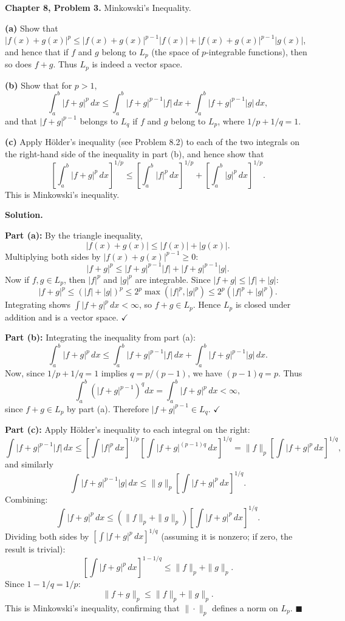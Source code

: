 \documentclass[12pt]{article}
\begin{document}
\textbf{Chapter 8, Problem 3.} Minkowski's Inequality.

\textbf{(a)} Show that $|f(x)+g(x)|^p \le |f(x)+g(x)|^{p-1}|f(x)| + |f(x)+g(x)|^{p-1}|g(x)|$, and hence that if $f$ and $g$ belong to $L_p$ (the space of $p$-integrable functions), then so does $f+g$. Thus $L_p$ is indeed a vector space.

\textbf{(b)} Show that for $p > 1$,
\[
\int_a^b |f+g|^p\,dx \le \int_a^b |f+g|^{p-1}|f|\,dx + \int_a^b |f+g|^{p-1}|g|\,dx,
\]
and that $|f+g|^{p-1}$ belongs to $L_q$ if $f$ and $g$ belong to $L_p$, where $1/p+1/q=1$.

\textbf{(c)} Apply H\"older's inequality (see Problem 8.2) to each of the two integrals on the right-hand side of the inequality in part (b), and hence show that
\[
\left[\int_a^b|f+g|^p\,dx\right]^{1/p} \le \left[\int_a^b|f|^p\,dx\right]^{1/p}+\left[\int_a^b|g|^p\,dx\right]^{1/p}.
\]
This is Minkowski's inequality.

\bigskip
\textbf{Solution.}

\textbf{Part (a):}
By the triangle inequality,
\[
|f(x)+g(x)| \le |f(x)| + |g(x)|.
\]
Multiplying both sides by $|f(x)+g(x)|^{p-1}\ge 0$:
\[
|f+g|^p \le |f+g|^{p-1}|f| + |f+g|^{p-1}|g|.
\]
Now if $f,g\in L_p$, then $|f|^p$ and $|g|^p$ are integrable. Since $|f+g|\le|f|+|g|$:
\[
|f+g|^p \le (|f|+|g|)^p \le 2^p\max(|f|^p,|g|^p) \le 2^p(|f|^p+|g|^p).
\]
Integrating shows $\int|f+g|^p\,dx < \infty$, so $f+g\in L_p$. Hence $L_p$ is closed under addition and is a vector space. $\checkmark$

\textbf{Part (b):}
Integrating the inequality from part (a):
\[
\int_a^b |f+g|^p\,dx \le \int_a^b |f+g|^{p-1}|f|\,dx + \int_a^b |f+g|^{p-1}|g|\,dx.
\]
Now, since $1/p+1/q=1$ implies $q = p/(p-1)$, we have $(p-1)q = p$. Thus
\[
\int_a^b \left(|f+g|^{p-1}\right)^q dx = \int_a^b |f+g|^p\,dx < \infty,
\]
since $f+g\in L_p$ by part (a). Therefore $|f+g|^{p-1}\in L_q$. $\checkmark$

\textbf{Part (c):}
Apply H\"older's inequality to each integral on the right:
\[
\int |f+g|^{p-1}|f|\,dx \le \left[\int|f|^p\,dx\right]^{1/p}\left[\int|f+g|^{(p-1)q}\,dx\right]^{1/q}
= \|f\|_p\left[\int|f+g|^p\,dx\right]^{1/q},
\]
and similarly
\[
\int|f+g|^{p-1}|g|\,dx \le \|g\|_p\left[\int|f+g|^p\,dx\right]^{1/q}.
\]
Combining:
\[
\int|f+g|^p\,dx \le (\|f\|_p+\|g\|_p)\left[\int|f+g|^p\,dx\right]^{1/q}.
\]
Dividing both sides by $\left[\int|f+g|^p\,dx\right]^{1/q}$ (assuming it is nonzero; if zero, the result is trivial):
\[
\left[\int|f+g|^p\,dx\right]^{1-1/q} \le \|f\|_p+\|g\|_p.
\]
Since $1-1/q = 1/p$:
\[
\boxed{\|f+g\|_p \le \|f\|_p + \|g\|_p.}
\]
This is Minkowski's inequality, confirming that $\|\cdot\|_p$ defines a norm on $L_p$. $\blacksquare$
\end{document}
